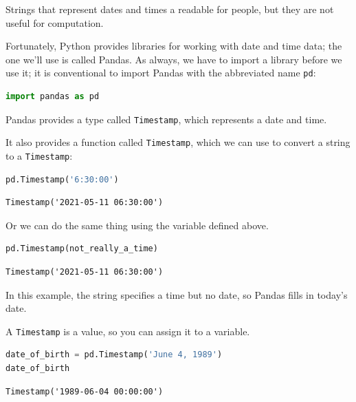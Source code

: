 Strings that represent dates and times a readable for people, but they
are not useful for computation.

Fortunately, Python provides libraries for working with date and time
data; the one we'll use is called Pandas. As always, we have to import a
library before we use it; it is conventional to import Pandas with the
abbreviated name \passthrough{\lstinline!pd!}:

\begin{lstlisting}[language=Python,style=source]
import pandas as pd
\end{lstlisting}

Pandas provides a type called \passthrough{\lstinline!Timestamp!}, which
represents a date and time.

It also provides a function called \passthrough{\lstinline!Timestamp!},
which we can use to convert a string to a
\passthrough{\lstinline!Timestamp!}:

\begin{lstlisting}[language=Python,style=source]
pd.Timestamp('6:30:00')
\end{lstlisting}

\begin{lstlisting}[style=output]
Timestamp('2021-05-11 06:30:00')
\end{lstlisting}

Or we can do the same thing using the variable defined above.

\begin{lstlisting}[language=Python,style=source]
pd.Timestamp(not_really_a_time)
\end{lstlisting}

\begin{lstlisting}[style=output]
Timestamp('2021-05-11 06:30:00')
\end{lstlisting}

In this example, the string specifies a time but no date, so Pandas
fills in today's date.

A \passthrough{\lstinline!Timestamp!} is a value, so you can assign it
to a variable.

\begin{lstlisting}[language=Python,style=source]
date_of_birth = pd.Timestamp('June 4, 1989')
date_of_birth
\end{lstlisting}

\begin{lstlisting}[style=output]
Timestamp('1989-06-04 00:00:00')
\end{lstlisting}

